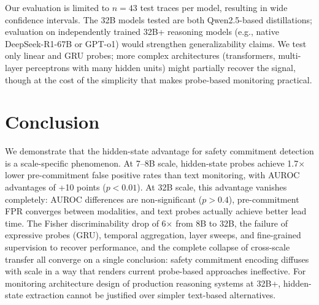 \documentclass[11pt]{article}
\begin{document}
Our evaluation is limited to $n{=}43$ test traces per model, resulting in wide confidence intervals. The 32B models tested are both Qwen2.5-based distillations; evaluation on independently trained 32B+ reasoning models (e.g., native DeepSeek-R1-67B or GPT-o1) would strengthen generalizability claims. We test only linear and GRU probes; more complex architectures (transformers, multi-layer perceptrons with many hidden units) might partially recover the signal, though at the cost of the simplicity that makes probe-based monitoring practical.

\section{Conclusion}

We demonstrate that the hidden-state advantage for safety commitment detection is a scale-specific phenomenon. At 7--8B scale, hidden-state probes achieve 1.7$\times$ lower pre-commitment false positive rates than text monitoring, with AUROC advantages of +10 points ($p{<}0.01$). At 32B scale, this advantage vanishes completely: AUROC differences are non-significant ($p{>}0.4$), pre-commitment FPR converges between modalities, and text probes actually achieve better lead time. The Fisher discriminability drop of 6$\times$ from 8B to 32B, the failure of expressive probes (GRU), temporal aggregation, layer sweeps, and fine-grained supervision to recover performance, and the complete collapse of cross-scale transfer all converge on a single conclusion: safety commitment encoding diffuses with scale in a way that renders current probe-based approaches ineffective. For monitoring architecture design of production reasoning systems at 32B+, hidden-state extraction cannot be justified over simpler text-based alternatives.



\end{document}
